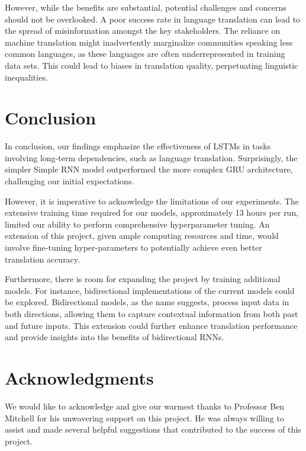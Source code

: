 \documentclass{article}
\begin{document}
However, while the benefits are substantial, potential challenges and concerns should not be overlooked. A poor success rate in language translation can lead to the spread of misinformation amongst the key stakeholders. The reliance on machine translation might inadvertently marginalize communities speaking less common languages, as these languages are often underrepresented in training data sets. This could lead to biases in translation quality, perpetuating linguistic inequalities. 

\section{Conclusion} 

In conclusion, our findings emphasize the effectiveness of LSTMs in tasks involving long-term dependencies, such as language translation. Surprisingly, the simpler Simple RNN model outperformed the more complex GRU architecture, challenging our initial expectations.

However, it is imperative to acknowledge the limitations of our experiments. The extensive training time required for our models, approximately 13 hours per run, limited our ability to perform comprehensive hyperparameter tuning. An extension of this project, given ample computing resources and time, would involve fine-tuning hyper-parameters to potentially achieve even better translation accuracy.

Furthermore, there is room for expanding the project by training additional models. For instance, bidirectional implementations of the current models could be explored. Bidirectional models, as the name suggests, process input data in both directions, allowing them to capture contextual information from both past and future inputs. This extension could further enhance translation performance and provide insights into the benefits of bidirectional RNNs.

\section*{Acknowledgments}


We would like to acknowledge and give our warmest thanks to Professor Ben Mitchell for his unwavering support on this project. He was always willing to assist and made several helpful suggestions that contributed to the success of this project.


\end{document}
